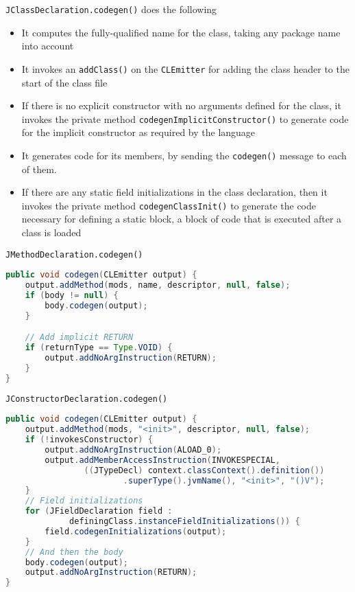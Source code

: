 \documentclass[8pt,a4paper,compress]{beamer}
\begin{document}
\begin{frame}[fragile]
\pause

\lstinline{JClassDeclaration.codegen()} does the following
\begin{itemize}
\pause
\item It computes the fully-qualified name for the class, taking any package name into account
\pause
\item It invokes an \lstinline{addClass()} on the \lstinline{CLEmitter} for adding the class header to the start of the class file
\pause
\item If there is no explicit constructor with no arguments defined for the class, it invokes the private method \lstinline{codegenImplicitConstructor()} to generate code for the implicit constructor as required by the language
\pause
\item It generates code for its members, by sending the \lstinline{codegen()} message to each of them.
\pause
\item If there are any static field initializations in the class declaration, then it invokes the private method \lstinline{codegenClassInit()} to generate the code necessary for defining a static block, a block of code that is executed after a class is loaded
\end{itemize}
\end{frame}

\begin{frame}[fragile]
\pause

\lstinline{JMethodDeclaration.codegen()}

\smallskip

\begin{lstlisting}[language=Java,style=focusin]
public void codegen(CLEmitter output) {
    output.addMethod(mods, name, descriptor, null, false);
    if (body != null) {
        body.codegen(output);
    }

    // Add implicit RETURN
    if (returnType == Type.VOID) {
        output.addNoArgInstruction(RETURN);
    }
}
\end{lstlisting}

\pause
\bigskip

\lstinline{JConstructorDeclaration.codegen()}

\smallskip

\begin{lstlisting}[language=Java,style=focusin]
public void codegen(CLEmitter output) {
    output.addMethod(mods, "<init>", descriptor, null, false);
    if (!invokesConstructor) {
        output.addNoArgInstruction(ALOAD_0);
        output.addMemberAccessInstruction(INVOKESPECIAL,
                ((JTypeDecl) context.classContext().definition())
                        .superType().jvmName(), "<init>", "()V");
    }
    // Field initializations
    for (JFieldDeclaration field : 
             definingClass.instanceFieldInitializations()) {
        field.codegenInitializations(output);
    }
    // And then the body
    body.codegen(output);
    output.addNoArgInstruction(RETURN);
}
\end{lstlisting}
\end{frame}
\end{document}
